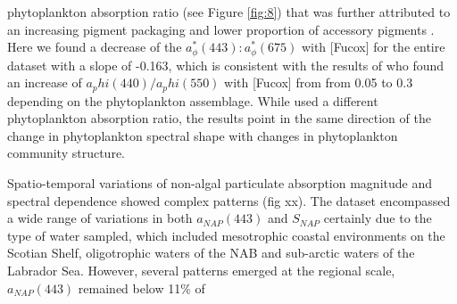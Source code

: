 \documentclass[utf8]{frontiersSCNS} %
\begin{document}
phytoplankton absorption ratio (see Figure \ref{fig:8}) that was further attributed to an increasing pigment packaging and lower proportion of accessory pigments \citep{Staehr2004, Vishnu2018}.  Here we found a decrease of the  $a^*_\phi(443):a^*_\phi(675)$ with [Fucox] for the entire dataset with a slope of -0.163, which is consistent with the results of \cite{hoepffner1993} who found an increase of $a_phi(440)/a_phi(550)$ with [Fucox] from from 0.05 to 0.3 depending on the phytoplankton assemblage. While \cite{hoepffner1993} used a different phytoplankton absorption ratio, the results point in the same direction of the change in phytoplankton spectral shape with changes in phytoplankton community structure. 

Spatio-temporal variations of non-algal particulate absorption magnitude and spectral dependence showed complex patterns (fig xx). The dataset encompassed a wide range of variations in both $a_{NAP}(443)$ and $S_{NAP}$ certainly due to the type of water sampled, which included mesotrophic coastal environments on the Scotian Shelf, oligotrophic waters of the NAB and sub-arctic waters of the Labrador Sea.  However, several patterns emerged at the regional scale, $a_{NAP}(443)$ remained below 11\% of 
\end{document}
